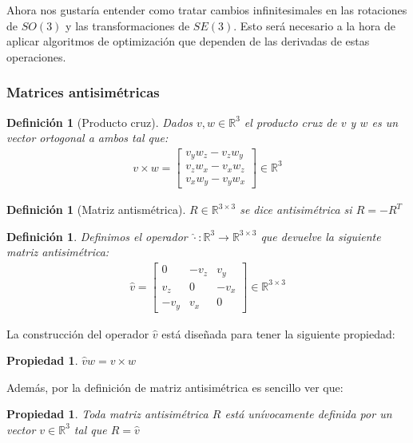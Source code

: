\documentclass[ twoside,openright,titlepage,numbers=noenddot,%
                headinclude,footinclude,cleardoublepage=empty,abstract=on,
                BCOR=-5mm,paper=a4,fontsize=11pt
                ]{scrreprt}
\newtheorem{definition}[theorem]{Definición}
\newtheorem{property}[theorem]{Propiedad}
\newcommand{\R}{\mathbb{R}}
\newcommand{\RR}[1]{\R^{#1 \times #1}}
\begin{document}
Ahora nos gustaría entender como tratar cambios infinitesimales en las
rotaciones de \(SO(3)\) y las transformaciones de \(SE(3)\). Esto será
necesario a la hora de aplicar algoritmos de optimización que dependen
de las derivadas de estas operaciones.

\hypertarget{matrices-antisimuxe9tricas}{%
\subsubsection{Matrices
antisimétricas}\label{matrices-antisimuxe9tricas}}

\begin{definition}[Producto cruz]Dados \(v, w \in \R^3\) el producto
cruz de \(v\) y \(w\) es un vector ortogonal a ambos tal que:
\begin{align}
v \times w = \begin{bmatrix}
v_y w_z - v_z w_y \\
v_z w_x - v_x w_z \\
v_x w_y - v_y w_x
\end{bmatrix} \in \R^3
\end{align}\end{definition}

\begin{definition}[Matriz antismétrica]\(R \in \RR3\) se dice
antisimétrica si \(R = -R^T\)\end{definition}

\begin{definition}Definimos el operador
\(\hat{\cdot} : \R^3 \rightarrow \RR3\) que devuelve la siguiente matriz
antisimétrica: \begin{align}
\hat{v} = \begin{bmatrix}
0 & -v_z & v_y \\
v_z & 0 & -v_x \\
-v_y & v_x & 0
\end{bmatrix} \in \RR3
\end{align}\end{definition}

La construcción del operador \(\hat{v}\) está diseñada para tener la
siguiente propiedad:

\begin{property}\(\hat{v} w = v \times w\)\end{property}

Además, por la definición de matriz antisimétrica es sencillo ver que:

\begin{property}\label{prop:skew-mat-vec}Toda matriz antisimétrica \(R\)
está unívocamente definida por un vector \(v \in \R^3\) tal que
\(R = \hat{v}\)\end{property}
\end{document}
